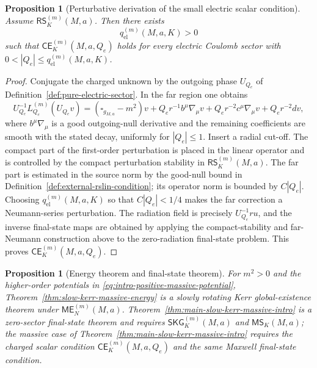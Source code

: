 \documentclass[11pt]{article}
\numberwithin{equation}{section}
\theoremstyle{plain}
\newtheorem{proposition}[theorem]{Proposition}
\theoremstyle{definition}
\theoremstyle{remark}
\newcommand{\SKG}{\mathsf{SKG}}
\newcommand{\CElec}{\mathsf{CE}}
\newcommand{\RSLin}{\mathsf{RS}}
\newcommand{\ME}{\mathsf{ME}}
\newcommand{\MScat}{\mathsf{MS}}
\begin{document}
\begin{proposition}[Perturbative derivation of the small electric scalar condition]\label{prop:perturbative-electric-condition}
Assume \(\RSLin^{(m)}_K(M,a)\).  Then there exists
\begin{equation}
 q_{\mathrm{el}}^{(m)}(M,a,K)>0
\end{equation}
such that \(\CElec^{(m)}_K(M,a,Q_e)\) holds for every electric Coulomb sector with \(0<|Q_e|\le q_{\mathrm{el}}^{(m)}(M,a,K)\).
\end{proposition}

\begin{proof}
Conjugate the charged unknown by the outgoing phase \(U_{Q_e}\) of Definition~\ref{def:pure-electric-sector}.  In the far region one obtains
\begin{equation}
 U_{Q_e}^{-1}L_{Q_e}^{(m)}(U_{Q_e}v)
 = (\square_{g_{M,a}}-m^2)v
 +Q_e r^{-1}b^\mu\nabla_\mu v
 +Q_e r^{-2}c^\mu\nabla_\mu v
 +Q_e r^{-2}dv,
 \label{eq:app-electric-normal-form}
\end{equation}
where \(b^\mu\nabla_\mu\) is a good outgoing-null derivative and the remaining coefficients are smooth with the stated decay, uniformly for \(|Q_e|\le1\).  Insert a radial cut-off.  The compact part of the first-order perturbation is placed in the linear operator and is controlled by the compact perturbation stability in \(\RSLin^{(m)}_K(M,a)\).  The far part is estimated in the source norm by the good-null bound in Definition~\ref{def:external-rslin-condition}; its operator norm is bounded by \(C|Q_e|\).  Choosing \(q_{\mathrm{el}}^{(m)}(M,a,K)\) so that \(C|Q_e|<1/4\) makes the far correction a Neumann-series perturbation.  The radiation field is precisely \(U_{Q_e}^{-1}ru\), and the inverse final-state maps are obtained by applying the compact-stability and far-Neumann construction above to the zero-radiation final-state problem.  This proves \(\CElec^{(m)}_K(M,a,Q_e)\).
\end{proof}

\begin{proposition}[Energy theorem and final-state theorem]\label{prop:app-energy-vs-scattering}
For \(m^2>0\) and the higher-order potentials in \eqref{eq:intro-positive-massive-potential}, Theorem~\ref{thm:slow-kerr-massive-energy} is a slowly rotating Kerr global-existence theorem under \(\ME^{(m)}_N(M,a)\).  Theorem~\ref{thm:main-slow-kerr-massive-intro} is a zero-sector final-state theorem and requires \(\SKG^{(m)}_K(M,a)\) and \(\MScat_K(M,a)\); the massive case of Theorem~\ref{thm:main-slow-kerr-massive-intro} requires the charged scalar condition \(\CElec^{(m)}_K(M,a,Q_e)\) and the same Maxwell final-state condition.
\end{proposition}
\end{document}
